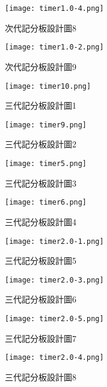 \begin{figure}
  \centering
  \texttt{[image: timer1.0-4.png]}
  \caption{次代記分板設計圖8}
  \label{fig:example}
\end{figure}



\begin{figure}
  \centering
  \texttt{[image: timer1.0-2.png]}
  \caption{次代記分板設計圖9}
  \label{fig:example}
\end{figure}




\begin{figure}
  \centering
  \texttt{[image: timer10.png]}
  \caption{三代記分板設計圖1}
  \label{fig:example}
\end{figure}


\begin{figure}
  \centering
  \texttt{[image: timer9.png]}
  \caption{三代記分板設計圖2}
  \label{fig:example}
\end{figure}


\begin{figure}
  \centering
  \texttt{[image: timer5.png]}
  \caption{三代記分板設計圖3}
  \label{fig:example}
\end{figure}


\begin{figure}
  \centering
  \texttt{[image: timer6.png]}
  \caption{三代記分板設計圖4}
  \label{fig:example}
\end{figure}


\begin{figure}
  \centering
  \texttt{[image: timer2.0-1.png]}
  \caption{三代記分板設計圖5}
  \label{fig:example}
\end{figure}


\begin{figure}
  \centering
  \texttt{[image: timer2.0-3.png]}
  \caption{三代記分板設計圖6}
  \label{fig:example}
\end{figure}


\begin{figure}
  \centering
  \texttt{[image: timer2.0-5.png]}
  \caption{三代記分板設計圖7}
  \label{fig:example}
\end{figure}


\begin{figure}
  \centering
  \texttt{[image: timer2.0-4.png]}
  \caption{三代記分板設計圖8}
  \label{fig:example}
\end{figure}



